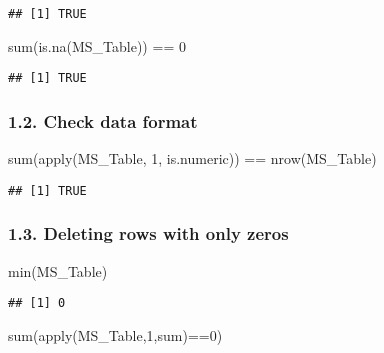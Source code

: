 \documentclass[
]{article}
\newenvironment{Shaded}{\begin{snugshade}}{\end{snugshade}}
\newcommand{\DecValTok}[1]{\textcolor[rgb]{0.00,0.00,0.81}{#1}}
\newcommand{\FunctionTok}[1]{\textcolor[rgb]{0.00,0.00,0.00}{#1}}
\newcommand{\NormalTok}[1]{#1}
\newcommand{\SpecialCharTok}[1]{\textcolor[rgb]{0.00,0.00,0.00}{#1}}
\begin{document}
\begin{verbatim}
## [1] TRUE
\end{verbatim}

\begin{Shaded}
\begin{Highlighting}[]
\FunctionTok{sum}\NormalTok{(}\FunctionTok{is.na}\NormalTok{(MS\_Table)) }\SpecialCharTok{==} \DecValTok{0}
\end{Highlighting}
\end{Shaded}

\begin{verbatim}
## [1] TRUE
\end{verbatim}

\hypertarget{check-data-format}{%
\subsubsection{1.2. Check data format}\label{check-data-format}}

\begin{Shaded}
\begin{Highlighting}[]
\FunctionTok{sum}\NormalTok{(}\FunctionTok{apply}\NormalTok{(MS\_Table, }\DecValTok{1}\NormalTok{, is.numeric)) }\SpecialCharTok{==} \FunctionTok{nrow}\NormalTok{(MS\_Table)}
\end{Highlighting}
\end{Shaded}

\begin{verbatim}
## [1] TRUE
\end{verbatim}

\hypertarget{deleting-rows-with-only-zeros}{%
\subsubsection{1.3. Deleting rows with only
zeros}\label{deleting-rows-with-only-zeros}}

\begin{Shaded}
\begin{Highlighting}[]
\FunctionTok{min}\NormalTok{(MS\_Table)}
\end{Highlighting}
\end{Shaded}

\begin{verbatim}
## [1] 0
\end{verbatim}

\begin{Shaded}
\begin{Highlighting}[]
\FunctionTok{sum}\NormalTok{(}\FunctionTok{apply}\NormalTok{(MS\_Table,}\DecValTok{1}\NormalTok{,sum)}\SpecialCharTok{==}\DecValTok{0}\NormalTok{)}
\end{Highlighting}
\end{Shaded}
\end{document}
